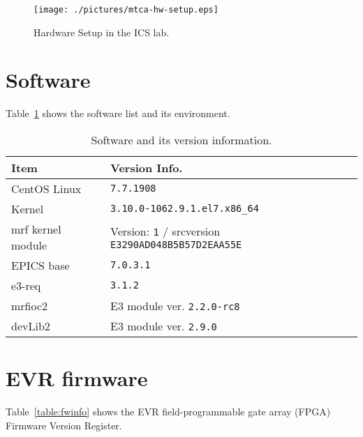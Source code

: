 \documentclass[11pt
  , a4paper
  , article
  , oneside
  , showtrims
]{memoir}
\begin{document}
\begin{figure}[!b]
  \centering
  \texttt{[image: ./pictures/mtca-hw-setup.eps]}
  \caption{Hardware Setup in the ICS lab.}
  \label{fig:mtca-hw-setup}
\end{figure}


\section{Software}
Table~\ref{table:swlist} shows the software list and its environment.

\begin{table}[!htb]
  \centering
  \begin{tabular}{l|l}
    \toprule
    Item               & Version Info.                                                       \\\midrule
    CentOS Linux       & \texttt{7.7.1908}                                                  \\\midrule
    Kernel             & \texttt{3.10.0-1062.9.1.el7.x86\_64}                               \\\midrule
    mrf kernel module  & Version: \texttt{1} / srcversion \texttt{E3290AD048B5B57D2EAA55E}  \\\midrule
    EPICS base         & \texttt{7.0.3.1}                                                   \\\midrule
    e3-req             & \texttt{3.1.2}                                                     \\\midrule
    mrfioc2            & E3 module ver. \texttt{2.2.0-rc8}                                  \\\midrule
    devLib2            & E3 module ver. \texttt{2.9.0}                                      \\\bottomrule
  \end{tabular}
  \caption[]{Software and its version information.}
  \label{table:swlist}
\end{table}


\section{EVR firmware}
Table~\ref{table:fwinfo} shows the EVR field-programmable gate array (FPGA) Firmware Version Register.
\end{document}
